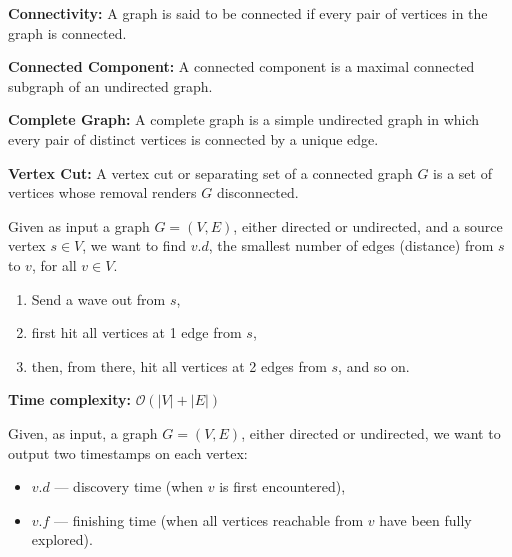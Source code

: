 \documentclass[a4paper,landscape]{article}
\begin{document}
\begin{multicols}{7}
\textbf{Connectivity:} A graph is said to be connected if every pair of vertices in the graph is connected.



\textbf{Connected Component:} A connected component is a maximal connected subgraph of an undirected graph.



\textbf{Complete Graph:} A complete graph is a simple undirected graph in which every pair of distinct vertices is connected by a unique edge.



\textbf{Vertex Cut:} A vertex cut or separating set of a connected graph $G$ is a set of vertices whose removal renders $G$ disconnected.
\endtcolorbox

\tcolorbox[mybox={Breadth-First Search}]
Given as input a graph $G = (V, E)$, either directed or undirected, and a source
vertex $s \in V$, we want to find $v.d$, the smallest number of edges (distance)
from $s$ to $v$, for all $v \in V$.

\begin{enumerate}[noitemsep, topsep=0pt]
    \item Send a wave out from $s$,
    \item first hit all vertices at 1 edge from $s$,
    \item then, from there, hit all vertices at 2 edges from $s$, and so on.
\end{enumerate}

\noindent %
\textbf{Time complexity:} $\mathcal{O}(|V| + |E|)$ \quad
\endtcolorbox

\tcolorbox[mybox={Depth-First Search}]
Given, as input, a graph $G = (V, E)$, either directed or undirected, we want to
output two timestamps on each vertex:
\begin{itemize}[noitemsep, topsep=0pt]
    \item $v.d$ — discovery time (when $v$ is first encountered),
    \item $v.f$ — finishing time (when all vertices reachable from $v$ have been fully explored).
\end{itemize}


\end{multicols}
\end{document}
